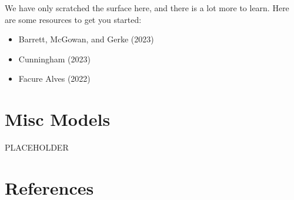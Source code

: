 \documentclass[
  letterpaper,
]{krantz}
\providecommand{\tightlist}{%
  \setlength{\itemsep}{0pt}\setlength{\parskip}{0pt}}\usepackage{longtable,booktabs,array}
\begin{document}
We have only scratched the surface here, and there is a lot more to
learn. Here are some resources to get you started:

\begin{itemize}
\tightlist
\item
  Barrett, McGowan, and Gerke (2023)
\item
  Cunningham (2023)
\item
  Facure Alves (2022)
\end{itemize}

\chapter{Misc Models}\label{misc-models}

PLACEHOLDER

\cleardoublepage
{}
{}
\appendix

\chapter{References}\label{references}
\end{document}
